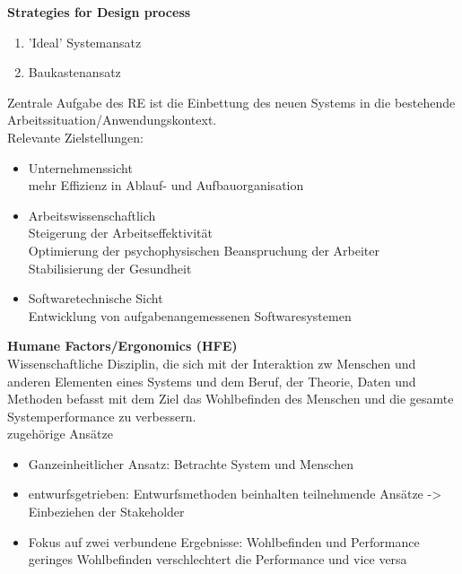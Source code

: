 \textbf{Strategies for Design process}
\begin{enumerate}
	\item 'Ideal' Systemansatz
	\item Baukastenansatz
\end{enumerate}

Zentrale Aufgabe des RE ist die Einbettung des neuen Systems in die bestehende Arbeitssituation/Anwendungskontext.\\
Relevante Zielstellungen:
\begin{itemize}
	\item Unternehmenssicht\\
	mehr Effizienz in Ablauf- und Aufbauorganisation
	
	\item Arbeitswissenschaftlich\\
	Steigerung der Arbeitseffektivität\\
	Optimierung der psychophysischen Beanspruchung der Arbeiter\\
	Stabilisierung der Gesundheit
	
	\item Softwaretechnische Sicht\\
	Entwicklung von aufgabenangemessenen Softwaresystemen
\end{itemize}

\textbf{Humane Factors/Ergonomics (HFE)}\\
Wissenschaftliche Disziplin, die sich mit der Interaktion zw Menschen und anderen Elementen eines Systems und dem Beruf, der Theorie, Daten und Methoden befasst mit dem Ziel das Wohlbefinden des Menschen und die gesamte Systemperformance zu verbessern.\\
zugehörige Ansätze
\begin{itemize}
	\item Ganzeinheitlicher Ansatz: Betrachte System und Menschen
	\item entwurfsgetrieben: Entwurfsmethoden beinhalten teilnehmende Ansätze -> Einbeziehen der Stakeholder
	\item Fokus auf zwei verbundene Ergebnisse: Wohlbefinden und Performance\\
	geringes Wohlbefinden verschlechtert die Performance und vice versa 
\end{itemize}
